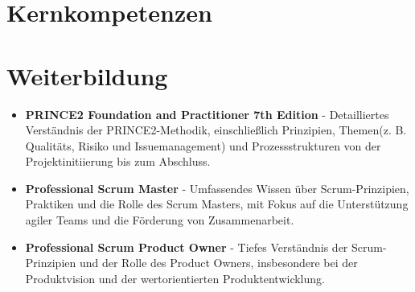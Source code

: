 \documentclass[11pt,a4paper,sans]{moderncv} %
\title{\normalfont{\textbf{\small{\color{black}Junior Projektmanager | Agile-Spezialist}}}}
\begin{document}
	\setlength{\quotewidth}{2.85\textwidth}
	\makecvtitle

	\section*{Kernkompetenzen}
	
	\section{Weiterbildung}
	 {}
	\cvitem{} {
		\begin{itemize}
			\item{{\textbf{PRINCE2 Foundation and Practitioner 7th Edition} - Detailliertes Verständnis der PRINCE2-Methodik, einschließlich Prinzipien, Themen(z. B. Qualitäts, Risiko und Issuemanagement) und Prozessstrukturen von der Projektinitiierung bis zum Abschluss.}} 
			\item{{\textbf{Professional Scrum Master} - Umfassendes Wissen über Scrum-Prinzipien, Praktiken und die Rolle des Scrum Masters, mit Fokus auf die Unterstützung agiler Teams und die Förderung von Zusammenarbeit.}}							
			\item{{\textbf{Professional Scrum Product Owner} - Tiefes Verständnis der Scrum-Prinzipien und der Rolle des Product Owners, insbesondere bei der Produktvision und der wertorientierten Produktentwicklung.}}
		\end{itemize}
	}	
\end{document}
